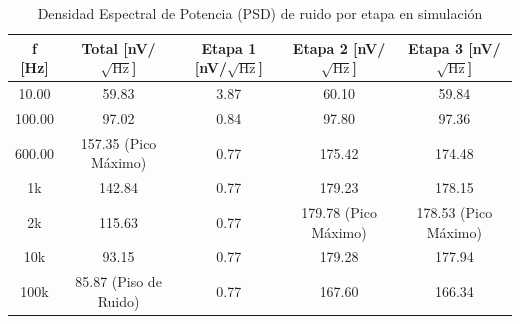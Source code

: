 \begin{table}[H]
\centering
\begin{tabular}{|c|c|c|c|c|}
\hline
\textbf{f [Hz]} & \textbf{Total [nV/$\sqrt{\text{Hz}}$]} & \textbf{Etapa 1 [nV/$\sqrt{\text{Hz}}$]} & \textbf{Etapa 2 [nV/$\sqrt{\text{Hz}}$]} & \textbf{Etapa 3 [nV/$\sqrt{\text{Hz}}$]} \\ \hline
10.00 & 59.83 & 3.87 & 60.10 & 59.84 \\ \hline
100.00 & 97.02 & 0.84 & 97.80 & 97.36 \\ \hline
600.00 & 157.35 (Pico Máximo) & 0.77 & 175.42 & 174.48 \\ \hline
1k & 142.84 & 0.77 & 179.23 & 178.15 \\ \hline
2k & 115.63 & 0.77 & 179.78 (Pico Máximo) & 178.53 (Pico Máximo) \\ \hline
10k & 93.15 & 0.77 & 179.28 & 177.94 \\ \hline
100k & 85.87 (Piso de Ruido) & 0.77 & 167.60 & 166.34 \\ \hline
\end{tabular}
\caption{Densidad Espectral de Potencia (PSD) de ruido por etapa en simulación}
\label{tab:psd_ruido}
\end{table}




